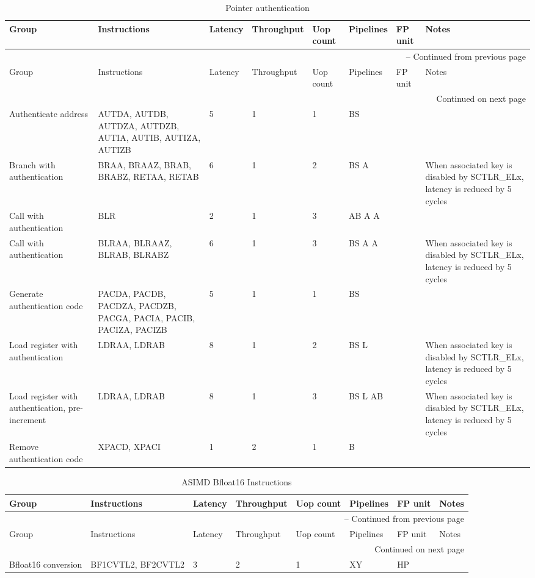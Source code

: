 \begin{longtable}{|p{1in}|p{1in}|l|l|l|p{1in}|l|p{1in}|}
\caption{Pointer authentication} \\
\hline
Group & Instructions & Latency & Throughput & Uop count & Pipelines & FP unit & Notes\\
\hline
\endfirsthead
\hline
\multicolumn{8}{|r|}{{\tablename\ \thetable{} -- Continued from previous page}} \\
\hline
Group & Instructions & Latency & Throughput & Uop count & Pipelines & FP unit & Notes\\
\hline
\endhead
\hline
\multicolumn{8}{|r|}{{Continued on next page}} \\
\hline
\endfoot
\hline
\endlastfoot
Authenticate address & AUTDA, AUTDB, AUTDZA, AUTDZB, AUTIA, AUTIB, AUTIZA, AUTIZB & 5 & 1 & 1 & BS &  & \\
\hline
Branch with authentication & BRAA, BRAAZ, BRAB, BRABZ, RETAA, RETAB & 6 & 1 & 2 & BS A &  & When associated key is disabled by SCTLR\_ELx, latency is reduced by 5 cycles\\
\hline
Call with authentication & BLR & 2 & 1 & 3 & AB A A &  & \\
\hline
Call with authentication & BLRAA, BLRAAZ, BLRAB, BLRABZ & 6 & 1 & 3 & BS A A &  & When associated key is disabled by SCTLR\_ELx, latency is reduced by 5 cycles\\
\hline
Generate authentication code & PACDA, PACDB, PACDZA, PACDZB, PACGA, PACIA, PACIB, PACIZA, PACIZB & 5 & 1 & 1 & BS &  & \\
\hline
Load register with authentication & LDRAA, LDRAB & 8 & 1 & 2 & BS L &  & When associated key is disabled by SCTLR\_ELx, latency is reduced by 5 cycles\\
\hline
Load register with authentication, pre-increment & LDRAA, LDRAB & 8 & 1 & 3 & BS L AB &  & When associated key is disabled by SCTLR\_ELx, latency is reduced by 5 cycles\\
\hline
Remove authentication code & XPACD, XPACI & 1 & 2 & 1 & B &  & \\
\hline
\end{longtable}
\newpage
\begin{longtable}{|p{1in}|p{1in}|l|l|l|p{1in}|l|p{1in}|}
\caption{ASIMD Bfloat16 Instructions} \\
\hline
Group & Instructions & Latency & Throughput & Uop count & Pipelines & FP unit & Notes\\
\hline
\endfirsthead
\hline
\multicolumn{8}{|r|}{{\tablename\ \thetable{} -- Continued from previous page}} \\
\hline
Group & Instructions & Latency & Throughput & Uop count & Pipelines & FP unit & Notes\\
\hline
\endhead
\hline
\multicolumn{8}{|r|}{{Continued on next page}} \\
\hline
\endfoot
\hline
\endlastfoot
Bfloat16 conversion & BF1CVTL{{2}}, BF2CVTL{{2}} & 3 & 2 & 1 & XY & HP & \\
\hline
\end{longtable}
